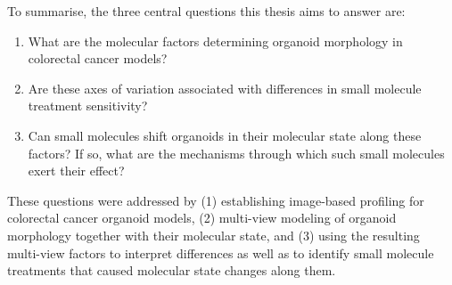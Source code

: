 \begin{flushleft}
To summarise, the three central questions this thesis aims to answer are:
\begin{enumerate}
    \item What are the molecular factors determining organoid morphology in colorectal cancer models?
    \item Are these axes of variation associated with differences in small molecule treatment sensitivity? 
    \item Can small molecules shift organoids in their molecular state along these factors? If so, what are the mechanisms through which such small molecules exert their effect?
\end{enumerate}

These questions were addressed by (1) establishing image-based profiling for colorectal cancer organoid models, (2) multi-view modeling of organoid morphology together with their molecular state, and (3) using the resulting multi-view factors to interpret differences as well as to identify small molecule treatments that caused molecular state changes along them.

\end{flushleft}